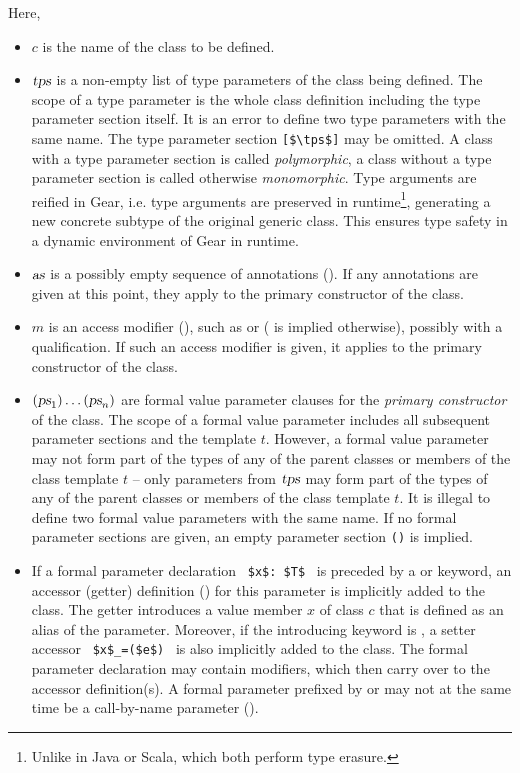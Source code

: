 Here, 
\begin{itemize}
\item[]
$c$ is the name of the class to be defined. 

\item[]
$\mbox{\sl tps}$ is a non-empty list of type parameters of the class being defined. The scope of a type parameter is the whole class definition including the type parameter section itself. It is an error to define two type parameters with the same name. The type parameter section \lstinline![$\tps$]! may be omitted. A class with a type parameter section is called {\em polymorphic}, a class without a type parameter section is called otherwise {\em monomorphic}. Type arguments are reified in Gear, i.e. type arguments are preserved in runtime\footnote{Unlike in Java or Scala, which both perform type erasure.}, generating a new concrete subtype of the original generic class. This ensures type safety in a dynamic environment of Gear in runtime. 

\item[]
$\mbox{\sl as}$ is a possibly empty sequence of annotations (). If any annotations are given at this point, they apply to the primary constructor of the class. 

\item[]
$m$ is an access modifier (), such as  or  ( is implied otherwise), possibly with a qualification. If such an access modifier is given, it applies to the primary constructor of the class. 

\item[]
$(\mbox{\sl ps}_1)\ldots(\mbox{\sl ps}_n)$ are formal value parameter clauses for the {\em primary constructor} of the class. The scope of a formal value parameter includes all subsequent parameter sections and the template $t$. However, a formal value parameter may not form part of the types of any of the parent classes or members of the class template $t$ -- only parameters from $\mbox{\sl tps}$ may form part of the types of any of the parent classes or members of the class template $t$. It is illegal to define two formal value parameters with the same name. If no formal parameter sections are given, an empty parameter section \lstinline!()! is implied. 

\item[]
If a formal parameter declaration ~\lstinline!$x$: $T$!~ is preceded by a  or  keyword, an accessor (getter) definition () for this parameter is implicitly added to the class. The getter introduces a value member $x$ of class $c$ that is defined as an alias of the parameter. Moreover, if the introducing keyword is , a setter accessor ~\lstinline!$x$_=($e$)!~ is also implicitly added to the class. The formal parameter declaration may contain modifiers, which then carry over to the accessor definition(s). A formal parameter prefixed by  or  may not at the same time be a call-by-name parameter (). 


\end{itemize}
